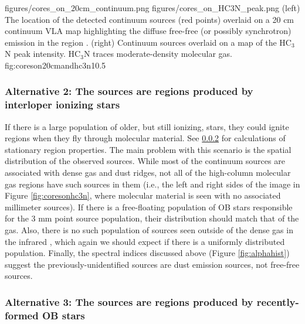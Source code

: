 \documentclass[twocolumn]{aastex61}
\begin{document}
\FigureTwo
{figures/cores_on_20cm_continuum.png}
{figures/cores_on_HC3N_peak.png}
{(left) The location of the detected continuum sources (red points) overlaid on a 20
cm continuum VLA map highlighting the diffuse free-free (or possibly
synchrotron) emission in the region \citep{Yusef-Zadeh2004a}.
(right) Continuum sources overlaid on a map
of the HC$_3$N peak intensity.  HC$_3$N traces moderate-density molecular gas.}
{fig:coreson20cmandhc3n}{1}{0.5\textwidth}

\subsubsection{Alternative 2: The sources are \hii regions produced by
interloper ionizing stars}
If there is a large population of older, but still ionizing, stars, they could
ignite \hii regions when they fly through molecular material.  See
\ref{sec:theyarehiiregions} for calculations of stationary \hii region
properties.  The main problem with this scenario is the spatial distribution of
the observed sources.  While most of the continuum sources are associated with
dense gas and dust ridges, not all of the high-column molecular gas regions
have such sources in them (i.e., the left and right sides of the image in
Figure \ref{fig:coresonhc3n}, where molecular material is seen with no
associated millimeter sources).  If there is a free-floating population of OB
stars responsible for the 3 mm point source population, their distribution
should match that of the gas.  Also, there is no such population of sources
seen outside of the dense gas in the infrared \citep[TODO: Who has done
infrared studies of Sgr B2?  You can infer what I have stated `by inspection'
of 2MASS, but it would be more straightforward to quote someone else][]{},
which again we should expect if there is a uniformly distributed population.  
Finally, the spectral indices discussed above (Figure \ref{fig:alphahist})
suggest the previously-unidentified sources are dust emission sources,
not free-free sources.



\subsubsection{Alternative 3: The sources are \hii regions produced by
recently-formed OB stars}
\label{sec:theyarehiiregions}
\end{document}
